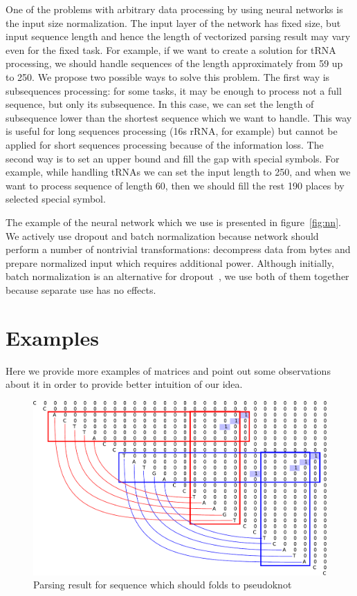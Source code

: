 \documentclass[a4paper,twoside]{article}
\begin{document}
One of the problems with arbitrary data processing by using neural networks is the input size normalization.
The input layer of the network has fixed size, but input sequence length and hence the length of vectorized parsing result may vary even for the fixed task.
For example, if we want to create a solution for tRNA processing, we should handle sequences of the length approximately from 59 up to 250.
We propose two possible ways to solve this problem.
The first way is subsequences processing: for some tasks, it may be enough to process not a full sequence, but only its subsequence.
In this case, we can set the length of subsequence lower than the shortest sequence which we want to handle. 
This way is useful for long sequences processing (16s rRNA, for example) but cannot be applied for short sequences processing because of the information loss.
The second way is to set an upper bound and fill the gap with special symbols.
For example, while handling tRNAs we can set the input length to 250, and when we want to process sequence of length 60, then we should fill the rest 190 places by selected special symbol.

The example of the neural network which we use is presented in figure~\ref{fig:nn}.
We actively use dropout and batch normalization because network should perform a number of nontrivial transformations: decompress data from bytes and prepare normalized input which requires additional power.
Although initially, batch normalization is an alternative for dropout~\cite{DBLP:journals:corr:IoffeS15}, we use both of them together because separate use has no effects.

\section{Examples}
\label{sec:examples}

\noindent Here we provide more examples of matrices and point out some observations about it in order to provide better intuition of our idea.

\begin{figure}
\centering
\includegraphics[width=.45\textwidth]{figures/5.pdf}
\caption{Parsing result for sequence which should folds to pseudoknot}
\label{fig:pseudoknot}
\end{figure}
\end{document}
